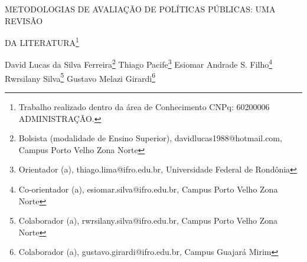 \documentclass[article,12pt,onesidea,4paper,english,brazil]{abntex2}
\begin{document}
	
	
	\frenchspacing 
	
	\begin{center}
		\LARGE METODOLOGIAS DE AVALIAÇÃO DE POLÍTICAS PÚBLICAS: UMA REVISÃO
		
		DA LITERATURA\footnote{Trabalho realizado dentro da área de Conhecimento CNPq: 60200006 ADMINISTRAÇÃO.}
		
		\normalsize
		David Lucas da Silva Ferreira\footnote{Bolsista (modalidade de Ensino Superior), davidlucas1988@hotmail.com, Campus Porto Velho Zona
			Norte} 
		Thiago Pacife\footnote{Orientador (a), thiago.lima@ifro.edu.br, Universidade Federal de Rondônia} 
		Esiomar Andrade S. Filho\footnote{Co-orientador (a), esiomar.silva@ifro.edu.br, Campus Porto Velho Zona Norte} 
		Rwrsilany Silva\footnote{Colaborador (a), rwrsilany.silva@ifro.edu.br, Campus Porto Velho Zona Norte}
		Gustavo Melazi Girardi\footnote{Colaborador (a), gustavo.girardi@ifro.edu.br, Campus Guajará Mirim} 
	\end{center}
	
\end{document}

